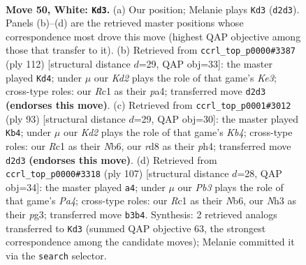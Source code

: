\documentclass[11pt]{article}
\begin{document}
\clearpage

\begin{figure}[p]\centering
\begin{subfigure}{0.46\textwidth}\centering
\resizebox{\linewidth}{!}{%
\newchessgame
\chessboard[
  setfen={3r1k2/5p1p/1r6/p5P1/3p4/1P5N/1R1K3P/2R5 w - - 1 50},
  showmover=false,
  pgfstyle=straightmove, color=movearrow, markmove={d2-d3}
]}
\caption{}
\end{subfigure}\hfill
\begin{subfigure}{0.46\textwidth}\centering
\resizebox{\linewidth}{!}{%
\newchessgame
\chessboard[
  setfen={3r4/2r3k1/7p/3PR3/p1p2P2/4K1P1/2R5/8 w - - 0 57},
  showmover=false,
  pgfstyle=straightmove, color=movearrow, markmove={e3-d4}
]}
\caption{}
\end{subfigure}
\\[4pt]
\begin{subfigure}{0.46\textwidth}\centering
\resizebox{\linewidth}{!}{%
\newchessgame
\chessboard[
  setfen={8/r4p2/1n6/1k1p3K/3P3P/p3PP2/2B5/R7 b - - 0 47},
  showmover=false,
  pgfstyle=straightmove, color=movearrow, markmove={b5-b4}
]}
\caption{}
\end{subfigure}\hfill
\begin{subfigure}{0.46\textwidth}\centering
\resizebox{\linewidth}{!}{%
\newchessgame
\chessboard[
  setfen={8/r5p1/1n2P2p/p4K1P/8/1pk3P1/5R2/R7 b - - 2 54},
  showmover=false,
  pgfstyle=straightmove, color=movearrow, markmove={a5-a4}
]}
\caption{}
\end{subfigure}
\caption{\textbf{Move 50, White: \texttt{Kd3}.} (a) Our position; Melanie plays \texttt{Kd3} (\texttt{d2d3}). Panels (b)--(d) are the retrieved master positions whose correspondence most drove this move (highest QAP objective among those that transfer to it). (b) Retrieved from \texttt{ccrl\_top\_p0000\#3387} (ply 112) [structural distance $d$=29, QAP obj=33]: the master played \texttt{Kd4}; under $\mu$ our \emph{Kd2} plays the role of that game's \emph{Ke3}; cross-type roles: our \emph{R}c1 as their \emph{p}a4; transferred move \texttt{d2d3} \textbf{(endorses this move)}. (c) Retrieved from \texttt{ccrl\_top\_p0001\#3012} (ply 93) [structural distance $d$=29, QAP obj=30]: the master played \texttt{Kb4}; under $\mu$ our \emph{Kd2} plays the role of that game's \emph{Kb4}; cross-type roles: our \emph{R}c1 as their \emph{N}b6, our \emph{r}d8 as their \emph{p}h4; transferred move \texttt{d2d3} \textbf{(endorses this move)}. (d) Retrieved from \texttt{ccrl\_top\_p0000\#3318} (ply 107) [structural distance $d$=28, QAP obj=34]: the master played \texttt{a4}; under $\mu$ our \emph{Pb3} plays the role of that game's \emph{Pa4}; cross-type roles: our \emph{R}c1 as their \emph{N}b6, our \emph{N}h3 as their \emph{p}g3; transferred move \texttt{b3b4}. Synthesis: 2 retrieved analogs transferred to \texttt{Kd3} (summed QAP objective 63, the strongest correspondence among the candidate moves); Melanie committed it via the \texttt{search} selector.}
\label{fig:thought-m98}
\end{figure}
\end{document}
